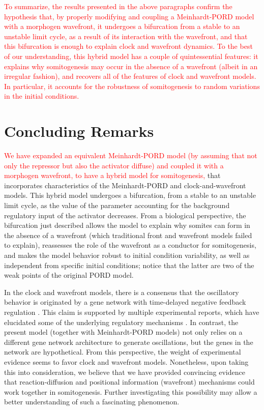 \documentclass[%
 preprint,
 aip, 
 amsmath,amssymb,
]{revtex4-2}
\begin{document}
\textcolor{red}{To summarize, the results presented in the above paragraphs confirm the hypothesis that, by properly modifying and coupling a Meinhardt-PORD model with a morphogen wavefront, it undergoes a bifurcation from a stable to an unstable limit cycle, as a result of its interaction with the wavefront, and that this bifurcation is enough to explain clock and wavefront dynamics. To the best of our understanding, this hybrid model has a couple of quintessential features: it explains why somitogenesis may occur in the absence of a wavefront (albeit in an irregular fashion), and recovers all of the features of clock and wavefront models. In particular, it accounts for the robustness of somitogenesis to random variations in the initial conditions.}
	
	
	\section{Concluding Remarks}
	\label{conclu}
	
\textcolor{red}{We have expanded an equivalent Meinhardt-PORD model (by assuming that not only the repressor but also the activator diffuse) and coupled it with a morphogen wavefront, to have a hybrid model for somitogenesis,} that incorporates characteristics of the Meinhardt-PORD and clock-and-wavefront models.  This hybrid model undergoes a bifurcation, from a stable to an unstable limit cycle, as the value of the parameter accounting for the background regulatory input of the activator decreases. From a biological perspective, the bifurcation just described allows the model to explain why somites can form in the absence of a wavefront (which traditional front and wavefront models failed to explain), reassesses the role of the wavefront as a conductor for somitogenesis, and makes the model behavior robust to initial condition variability, as well as independent from specific initial conditions; notice that the latter are two of the weak points of the original PORD model. 
	
	In the clock and wavefront models, there is a consensus that the oscillatory behavior is originated by a gene network with time-delayed negative feedback regulation \cite{Monk2003, Lewis2003}. This claim is supported by multiple experimental reports, which have elucidated some of the underlying regulatory mechanisms \cite{Schroter2012}. In contrast, the present model (together with Meinhardt-PORD models) not only relies on a different gene network architecture to generate oscillations, but the genes in the network are hypothetical. From this perspective, the weight of experimental evidence seems to favor clock and wavefront models. Nonetheless, upon taking this into consideration, we believe that we have provided convincing evidence that reaction-diffusion and positional information (wavefront) mechanisms could work together in somitogenesis. Further investigating this possibility may allow a better understanding of such a fascinating phenomenon.
	
\end{document}

